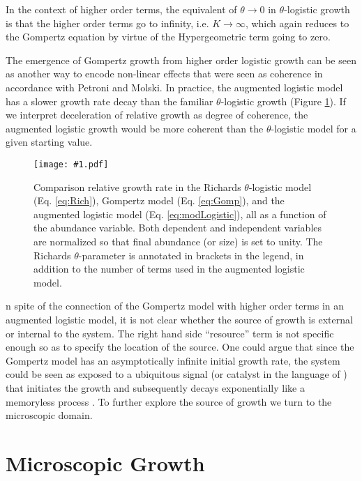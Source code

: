 \documentclass{article}
\newcommand{\insertPdfFig}[3]{
  \begin{figure}[H]
  \centering
  \texttt{[image: \#1.pdf]}
  \caption{#2}
  \label{fig:#1}
  \end{figure}
}
\begin{document}
 In the context of higher order terms, the equivalent of $\theta\rightarrow 0$ in $\theta$-logistic growth is that the higher order terms go to infinity, i.e. $K \rightarrow \infty$, which again reduces to the Gompertz equation by virtue of the Hypergeometric term going to zero. 

 The emergence of Gompertz growth from higher order logistic growth can be seen as another way to encode non-linear effects that were seen as coherence in accordance with Petroni and Molski. In practice, the augmented logistic model has a slower growth rate decay than the familiar $\theta$-logistic growth (Figure \ref{fig:hypergeometric_plain}). If we interpret deceleration of relative growth as degree of coherence, the augmented logistic growth would be more coherent than the $\theta$-logistic model for a given starting value. 

\insertPdfFig{hypergeometric_plain}{Comparison relative growth rate in the Richards $\theta$-logistic model (Eq. \ref{eq:Rich}), Gompertz model (Eq. \ref{eq:Gomp}), and the augmented logistic model (Eq. \ref{eq:modLogistic}), all as a function of the abundance variable. Both dependent and independent variables are normalized so that final abundance (or size) is set to unity. The Richards $\theta$-parameter is annotated in brackets in the legend, in addition to the number of terms used in the augmented logistic model.} 

In spite of the connection of the Gompertz model with higher order terms in an augmented logistic model, it is not clear whether the source of growth is external or internal to the system. The right hand side ``resource'' term is not specific enough so as to specify the location of the source. One could argue that since the Gompertz model has an asymptotically infinite initial growth rate, the system could be seen as exposed to a ubiquitous signal (or catalyst in the language of \citet{markov2019reaction}) that initiates the growth and subsequently decays exponentially like a memoryless process \citep{durrett1999essentials}. To further explore the source of growth we turn to the microscopic domain.

\section{Microscopic Growth}
\label{sec:micro}
\end{document}
